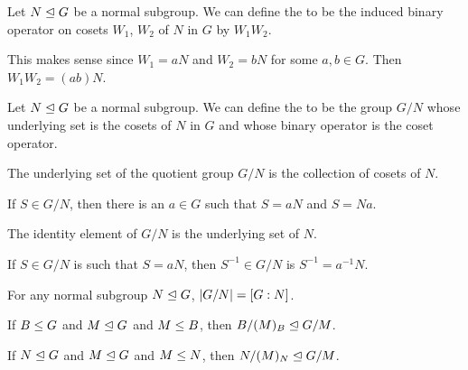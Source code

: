 \begin{definition}
Let $N\trianglelefteq G$ be a normal subgroup. We can define the
 to be the induced binary operator on cosets
$W_{1}$, $W_{2}$ of $N$ in $G$ by $W_{1}W_{2}$.
\end{definition}

\begin{def-remark}
This makes sense since $W_{1}=aN$ and $W_{2}=bN$ for some $a,b\in G$.
Then $W_{1}W_{2}=(ab)N$.
\end{def-remark}

\begin{definition}
Let $N\trianglelefteq G$ be a normal subgroup. We can define the
 to be the group $G/N$ whose underlying set is
the cosets of $N$ in $G$ and whose binary operator is
the coset operator.
\end{definition}

\begin{theorem}
The underlying set of the quotient group $G/N$ is the collection of
cosets of $N$.
\end{theorem}

\begin{theorem}
If $S\in G/N$, then there is an $a\in G$ such that $S=aN$ and $S=Na$.
\end{theorem}

\begin{theorem}
The identity element of $G/N$ is the underlying set of $N$.
\end{theorem}

\begin{theorem}
If $S\in G/N$ is such that $S=aN$, then $S^{-1}\in G/N$ is $S^{-1}=a^{-1}N$.
\end{theorem}

\begin{theorem}
For any normal subgroup $N\trianglelefteq G$, $|G/N|=[G : N]$.
\end{theorem}

\begin{theorem}
If $B\leq G$ and $M\trianglelefteq G$ and $M\leq B$,
then $B/(M)_{B}\trianglelefteq G/M$.
\end{theorem}

\begin{theorem}
If $N\trianglelefteq G$ and $M\trianglelefteq G$ and $M\leq N$,
then $N/(M)_{N}\trianglelefteq G/M$.
\end{theorem}